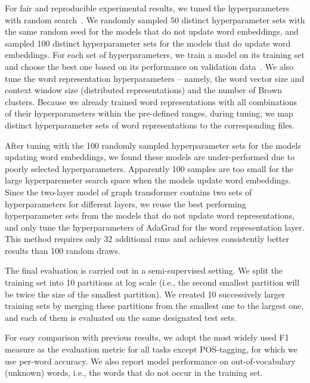 For fair and reproducible experimental results, we tuned the hyperparameters with random search~\cite{bergstra2012random}. 
We randomly sampled 50 distinct hyperparameter sets with the same random seed for the models that do not update word embeddings, and sampled 100 distinct hyperparameter sets for the models that do update word embeddings. 
For each set of hyperparameters, we train a model on its training set and choose the best one based on its performance on validation data~\cite{turian2010word}. 
We also tune the word representation hyperparameters -- namely, the word vector size and context window size (distributed representations) and the number of Brown clusters. Because we already trained word representations with all combinations of their hyperparameters within the pre-defined ranges, during tuning, we map distinct hyperparameter sets of word representations to the corresponding files. 

After tuning with the 100 randomly sampled hyperparameter sets for the models updating word embeddings, we found these models are under-performed due to poorly selected hyperparameters. Apparently 100 samples are too small for the large hyperparemeter search space when the models update word embeddings. Since the two-layer model of graph transformer contains two sets of hyperparameters for different layers, we reuse the best performing hyperparameter sets from the models that do not update word representations, and only tune the hyperparameters of AdaGrad for the word representation layer. This method requires only 32 additional runs and achieves consistently better results than 100 random draws.

The final evaluation is carried out in a semi-supervised setting. We split the training set into 10 partitions at log scale (i.e., the second smallest partition will be twice the size of the smallest partition). We created 10 successively larger training sets by merging these partitions from the smallest one to the largest one, and each of them is evaluated on the same designated test sets. 

For easy comparison with previous results, we adopt the most widely used F1 measure as the evaluation metric for all tasks except POS-tagging, for which we use per-word accuracy. We also report model performance on out-of-vocabulary (unknown) words, i.e., the words that do not occur in the training set.

